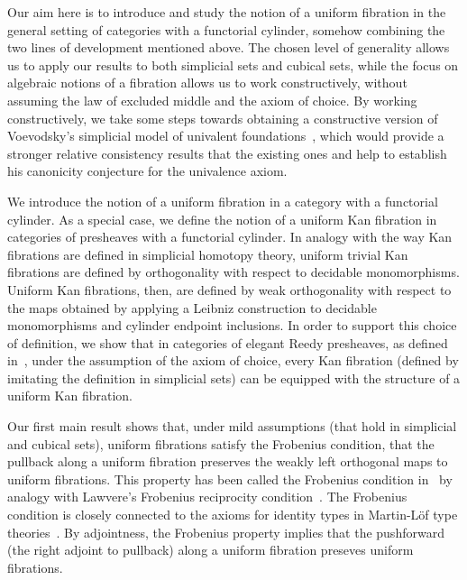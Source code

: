 \documentclass[reqno,10pt,a4paper,oneside,draft]{amsart}
\begin{document}
Our aim here is to introduce and study the notion of a uniform fibration in the general setting of categories with a functorial cylinder, somehow combining the two lines of development mentioned above. The chosen level of generality allows us to apply our results to both simplicial sets and cubical sets, while the focus on algebraic notions of a fibration allows us to work constructively, \ie without assuming the law of excluded middle and the axiom of choice. By working constructively, we take some steps towards obtaining a constructive version of Voevodsky's simplicial model of univalent foundations~\cite{voevodsky-simplicial-model}, which would provide a stronger relative consistency results that the existing ones and help to establish his canonicity conjecture for the univalence axiom.

We introduce the notion of a uniform fibration in a category with a functorial cylinder. As a special case, we define the notion of a uniform Kan fibration in categories of presheaves with a functorial cylinder.
In analogy with the way Kan fibrations are defined in simplicial homotopy theory, uniform trivial Kan fibrations are defined by orthogonality with respect to decidable monomorphisms. Uniform Kan fibrations, then, are defined by weak orthogonality with respect to the maps obtained by applying a Leibniz construction to decidable monomorphisms and cylinder endpoint inclusions. In order to support this choice of definition, we show that in categories of elegant Reedy presheaves, as defined in~\cite{bergner-rezk-elegant}, under the assumption of the axiom of choice, every Kan fibration (defined by imitating the definition in simplicial sets) can be equipped with the structure of a uniform Kan fibration.

Our first main result shows that, under mild assumptions (that hold in simplicial and cubical sets), uniform fibrations satisfy the Frobenius condition, \ie that the pullback along a uniform fibration preserves the weakly left orthogonal maps to uniform fibrations. This property has been called the Frobenius condition in~\cite{garner:types-omega-groupoids} by analogy with Lawvere's Frobenius reciprocity condition~\cite{lawvere-equality}.
The Frobenius condition is closely connected to the axioms for identity types in Martin-L\"of type theories~\cite[Section~4]{gambino-garner:idtypewfs}.
By adjointness, the Frobenius property implies that the pushforward (\ie the right adjoint to pullback) along a uniform fibration preseves uniform fibrations.
\end{document}
